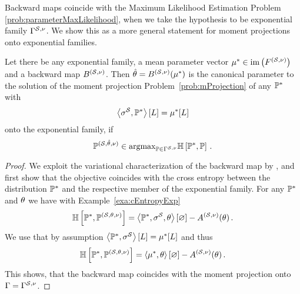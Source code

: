 
Backward maps coincide with the Maximum Likelihood Estimation Problem \eqref{prob:parameterMaxLikelihood}, when we take the hypothesis to be exponential family $\Gamma^{\mathcal{S},\nu}$. %
We show this as a more general statement for moment projections onto exponential families.

\begin{theorem}
    Let there be any exponential family, a mean parameter vector $\mu^*\in\mathrm{im}\left(F^{(\mathcal{S},\nu)}\right)$ and a backward map $B^{(\mathcal{S},\nu)}$.
    Then $\hat{\theta}=B^{(\mathcal{S},\nu)}(\mu^*)$ is the canonical parameter to the solution of the moment projection Problem~\eqref{prob:mProjection} of any $\mathbb{P}^*$ with
    \begin{align*}
        \left\langle \sigma^{\mathcal{S}},\mathbb{P}^*\right\rangle \left[ L \right]=\mu^*[L]
    \end{align*}
    onto the exponential family, if
    \[ \mathbb{P}^{(\mathcal{S},\hat{\theta},\nu)} \in \mathrm{argmax}_{\mathbb{P}\in\Gamma^{\mathcal{S},\nu}} \mathbb{H}\left[\mathbb{P}^*,\mathbb{P}\right]  \, . \]

\end{theorem}
\begin{proof}
    We exploit the variational characterization of the backward map by , and first show that the objective coincides with the cross entropy between the distribution $\mathbb{P}^*$ and the respective member of the exponential family.
    For any $\mathbb{P}^*$ and $\theta$ we have with Example~\ref{exa:cEntropyExp}
    \begin{align*}
        \mathbb{H}\left[\mathbb{P}^*,\mathbb{P}^{(\mathcal{S},\theta,\nu)}\right]
        = \left\langle \mathbb{P}^*,\sigma^{\mathcal{S}},\theta\right\rangle \left[ \varnothing \right] -A^{(\mathcal{S},\nu)}(\theta) \, .
    \end{align*}
    We use that by assumption $\left\langle \mathbb{P}^*,\sigma^{\mathcal{S}}\right\rangle \left[ L \right]=\mu^*[L]$ and thus
    \begin{align*}
        \mathbb{H}\left[\mathbb{P}^*,\mathbb{P}^{(\mathcal{S},\theta,\nu)}\right]
        =   \left\langle \mu^*,\theta\right\rangle \left[ \varnothing \right] -A^{(\mathcal{S},\nu)}(\theta) \, .
    \end{align*}
    This shows, that the backward map coincides with the moment projection onto $\Gamma=\Gamma^{\mathcal{S},\nu}$.
\end{proof}

